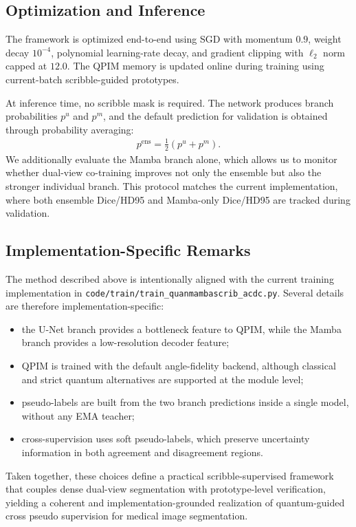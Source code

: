 \subsection{Optimization and Inference}
\label{subsec:optimization_inference}
The framework is optimized end-to-end using SGD with momentum $0.9$, weight decay $10^{-4}$, polynomial learning-rate decay, and gradient clipping with $\ell_2$ norm capped at $12.0$. The QPIM memory is updated online during training using current-batch scribble-guided prototypes.

At inference time, no scribble mask is required. The network produces branch probabilities $p^u$ and $p^m$, and the default prediction for validation is obtained through probability averaging:
\begin{align}
    p^{\mathrm{ens}} = \frac{1}{2}(p^u + p^m).
\end{align}
We additionally evaluate the Mamba branch alone, which allows us to monitor whether dual-view co-training improves not only the ensemble but also the stronger individual branch. This protocol matches the current implementation, where both ensemble Dice/HD95 and Mamba-only Dice/HD95 are tracked during validation.

\subsection{Implementation-Specific Remarks}
\label{subsec:impl_remarks}
The method described above is intentionally aligned with the current training implementation in \texttt{code/train/train\_quanmambascrib\_acdc.py}. Several details are therefore implementation-specific:
\begin{itemize}
\item the U-Net branch provides a bottleneck feature to QPIM, while the Mamba branch provides a low-resolution decoder feature;
\item QPIM is trained with the default angle-fidelity backend, although classical and strict quantum alternatives are supported at the module level;
\item pseudo-labels are built from the two branch predictions inside a single model, without any EMA teacher;
\item cross-supervision uses soft pseudo-labels, which preserve uncertainty information in both agreement and disagreement regions.
\end{itemize}

Taken together, these choices define a practical scribble-supervised framework that couples dense dual-view segmentation with prototype-level verification, yielding a coherent and implementation-grounded realization of quantum-guided cross pseudo supervision for medical image segmentation.
